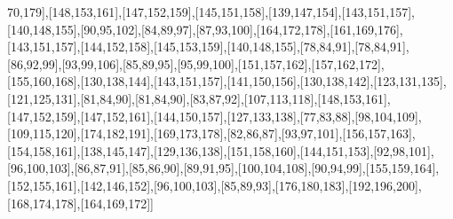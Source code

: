 70,179],[148,153,161],[147,152,159],[145,151,158],[139,147,154],[143,151,157],[140,148,155],[90,95,102],[84,89,97],[87,93,100],[164,172,178],[161,169,176],[143,151,157],[144,152,158],[145,153,159],[140,148,155],[78,84,91],[78,84,91],[86,92,99],[93,99,106],[85,89,95],[95,99,100],[151,157,162],[157,162,172],[155,160,168],[130,138,144],[143,151,157],[141,150,156],[130,138,142],[123,131,135],[121,125,131],[81,84,90],[81,84,90],[83,87,92],[107,113,118],[148,153,161],[147,152,159],[147,152,161],[144,150,157],[127,133,138],[77,83,88],[98,104,109],[109,115,120],[174,182,191],[169,173,178],[82,86,87],[93,97,101],[156,157,163],[154,158,161],[138,145,147],[129,136,138],[151,158,160],[144,151,153],[92,98,101],[96,100,103],[86,87,91],[85,86,90],[89,91,95],[100,104,108],[90,94,99],[155,159,164],[152,155,161],[142,146,152],[96,100,103],[85,89,93],[176,180,183],[192,196,200],[168,174,178],[164,169,172]]

